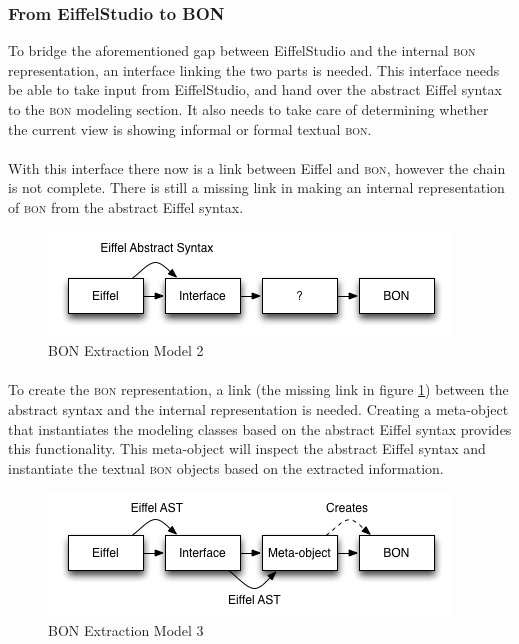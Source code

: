 \subsubsection{From EiffelStudio to BON}
To bridge the aforementioned gap between EiffelStudio and the internal \textsc{bon} representation, an interface linking the two parts is needed. This interface needs be able to take input from EiffelStudio, and hand over the abstract Eiffel syntax to the \textsc{bon} modeling section. It also needs to take care of determining whether the current view is showing informal or formal textual \textsc{bon}.

\paragraph{}
With this interface there now is a link between Eiffel and \textsc{bon}, however the chain is not complete. There is still a missing link in making an internal representation of \textsc{bon} from the abstract Eiffel syntax.
\begin{figure}[H]
\centering
\includegraphics[scale=0.8]{images/BON-extraction-model-2.png}
\caption{BON Extraction Model 2}
\label{fig:bon_extraction_2}
\end{figure}

\paragraph{}
To create the \textsc{bon} representation, a link (the missing link in figure \ref{fig:bon_extraction_2}) between the abstract syntax and the internal representation is needed. Creating a meta-object that instantiates the modeling classes based on the abstract Eiffel syntax provides this functionality. This meta-object will inspect the abstract Eiffel syntax and instantiate the textual \textsc{bon} objects based on the extracted information.
\begin{figure}[H]
\centering
\includegraphics[scale=0.8]{images/BON-extraction-model-3.png}
\caption{BON Extraction Model 3}
\label{fig:bon_extraction_3}
\end{figure}

